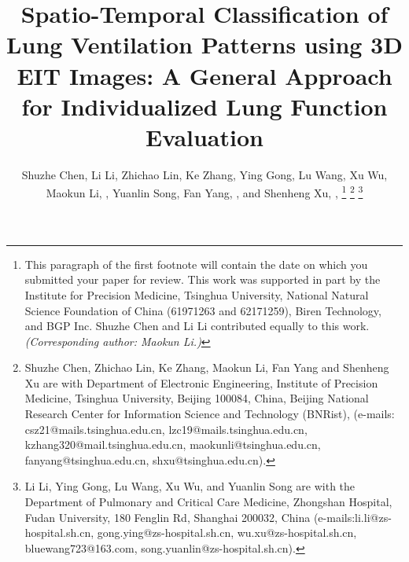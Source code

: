 \documentclass[journal,twoside,web]{ieeecolor}
\begin{document}
\title{Spatio-Temporal Classification of Lung Ventilation Patterns using 3D EIT Images: A General Approach for Individualized Lung Function Evaluation}

\author{Shuzhe Chen, Li Li, Zhichao Lin, Ke Zhang, Ying Gong, Lu Wang, Xu Wu, Maokun Li, , Yuanlin Song, Fan Yang, , and Shenheng Xu, ,
\thanks{This paragraph of the first footnote will contain the date on 
which you submitted your paper for review. This work was supported in part by the Institute for Precision Medicine,  
Tsinghua University, National Natural Science Foundation of China (61971263 and 62171259), 
Biren Technology, and BGP Inc. Shuzhe Chen and Li Li contributed equally to this work. \emph{(Corresponding author: Maokun Li.)}}
\thanks{Shuzhe Chen, Zhichao Lin, Ke Zhang, Maokun Li, Fan Yang and Shenheng Xu are with Department of Electronic Engineering, Institute of Precision Medicine, Tsinghua University, Beijing 100084, China, Beijing National Research Center for Information Science and Technology (BNRist),  (e-mails: csz21@mails.tsinghua.edu.cn, lzc19@mails.tsinghua.edu.cn, kzhang320@mail.tsinghua.edu.cn, maokunli@tsinghua.edu.cn, fanyang@tsinghua.edu.cn, shxu@tsinghua.edu.cn).}
\thanks{Li Li, Ying Gong, Lu Wang, Xu Wu, and Yuanlin Song are with the Department of Pulmonary and Critical Care Medicine, Zhongshan Hospital, Fudan University, 180 Fenglin Rd, Shanghai 200032, China (e-mails:li.li@zs-hospital.sh.cn, gong.ying@zs-hospital.sh.cn, wu.xu@zs-hospital.sh.cn, bluewang723@163.com, song.yuanlin@zs-hospital.sh.cn).}
}
\maketitle
\end{document}

